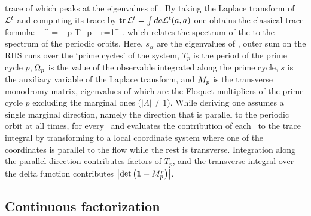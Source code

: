 	\label{eq-ResolventA}
\eeq
trace of which peaks at the eigenvalues of \Aop. By taking the
Laplace transform of ${\cal L}^{t}$ and computing its trace
by $\mbox{\rm tr}\, {\cal L}^{t} = \int da {\cal L}^{t} (a,a)$ one obtains the
classical trace formula:
\beq
\sum_{}^{\infty}  = \sum_p T_p
\sum_{r=1}^{\infty}  .
which relates the spectrum of the {\evOper} to the spectrum of the periodic
orbits. Here, $s_{\alpha}$ are the eigenvalues of \Aop ,
outer sum on the RHS runs over the `prime cycles' of the system,
$T_p$ is the period of the prime cycle $p$, $\Omega_p$ is the value of
the observable integrated along the prime cycle, $s$ is the auxiliary
variable of the Laplace transform, and $M_p$ is the transverse
monodromy matrix, eigenvalues of which are the Floquet multipliers of the prime
cycle $p$ excluding the marginal ones ($|\Lambda| \neq 1$). While deriving
 one assumes a single marginal direction, namely
the direction that is parallel to the periodic orbit at all times, for every 
\po\ and evaluates the contribution of each \po\ to the trace integral by 
transforming to a local coordinate system where one of the coordinates is 
parallel to the flow while the rest is transverse. Integration along the 
parallel direction contributes factors of $T_p$, and the transverse integral 
over the delta function contributes $\left|\mbox{\rm det}\,\!\left({\bf 1}-M_p^{r}\right)\right|$. 

\subsection{Continuous factorization}
\label{s-ContFac}

